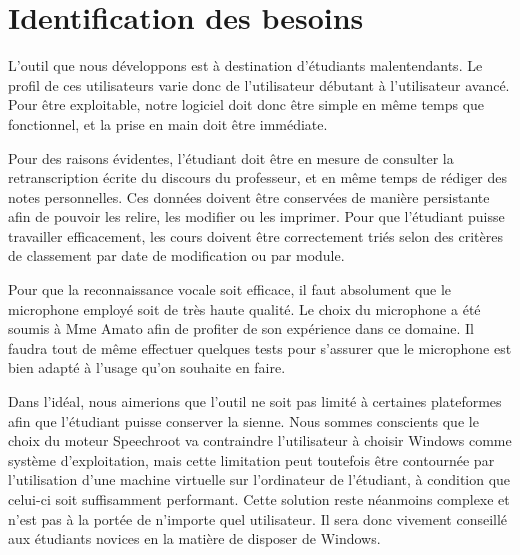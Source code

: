 \chapter{Identification des besoins}

L'outil que nous développons est à destination d'étudiants malentendants.
Le profil de ces utilisateurs varie donc de l'utilisateur débutant à l'utilisateur avancé.
Pour être exploitable, notre logiciel doit donc être simple en même temps que fonctionnel, et la prise en main doit être immédiate.

Pour des raisons évidentes, l'étudiant doit être en mesure de consulter la retranscription écrite du discours du professeur, et en même temps de rédiger des notes personnelles.
Ces données doivent être conservées de manière persistante afin de pouvoir les relire, les modifier ou les imprimer.
Pour que l'étudiant puisse travailler efficacement, les cours doivent être correctement triés selon des critères de classement par date de modification ou par module.

Pour que la reconnaissance vocale soit efficace, il faut absolument que le microphone employé soit de très haute qualité.
Le choix du microphone a été soumis à Mme Amato afin de profiter de son expérience dans ce domaine.
Il faudra tout de même effectuer quelques tests pour s'assurer que le microphone est bien adapté à l'usage qu'on souhaite en faire.

Dans l'idéal, nous aimerions que l'outil ne soit pas limité à certaines plateformes afin que l'étudiant puisse conserver la sienne.
Nous sommes conscients que le choix du moteur Speechroot va contraindre l'utilisateur à choisir Windows comme système d'exploitation, mais cette limitation peut toutefois être contournée par l'utilisation d'une machine virtuelle sur l'ordinateur de l'étudiant, à condition que celui-ci soit suffisamment performant.
Cette solution reste néanmoins complexe et n'est pas à la portée de n'importe quel utilisateur.
Il sera donc vivement conseillé aux étudiants novices en la matière de disposer de Windows.


